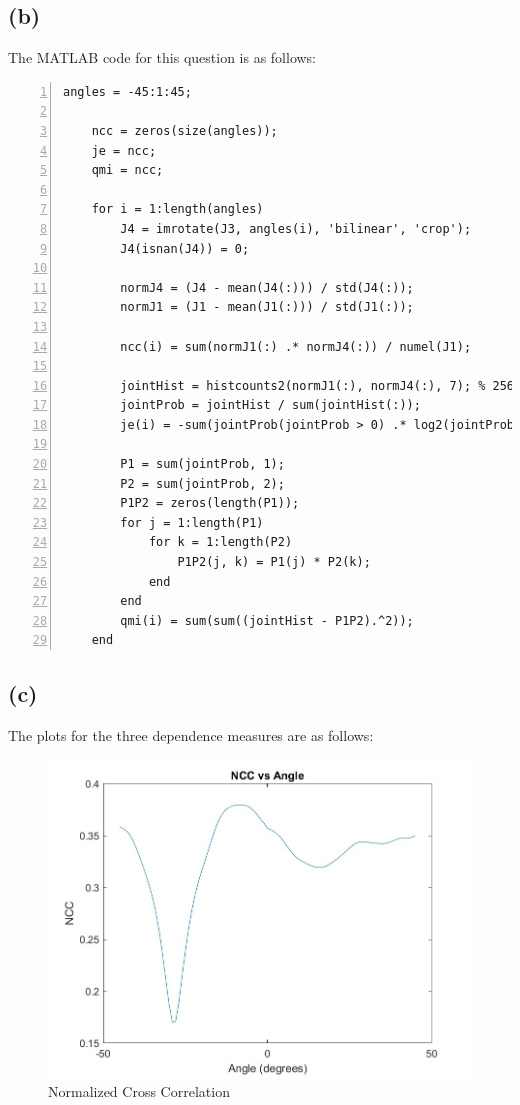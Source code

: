 \documentclass{article}
\begin{document}
\newpage
\subsection*{(b)}

The MATLAB code for this question is as follows:
\begin{lstlisting}[frame=single,numbers=left,style=Matlab-Pyglike,breaklines=true,postbreak=\mbox{\textcolor{red}{$\hookrightarrow$}\space}]
    angles = -45:1:45;

    ncc = zeros(size(angles));
    je = ncc;
    qmi = ncc;
    
    for i = 1:length(angles)
        J4 = imrotate(J3, angles(i), 'bilinear', 'crop');
        J4(isnan(J4)) = 0;
        
        normJ4 = (J4 - mean(J4(:))) / std(J4(:));
        normJ1 = (J1 - mean(J1(:))) / std(J1(:));
        
        ncc(i) = sum(normJ1(:) .* normJ4(:)) / numel(J1);
        
        jointHist = histcounts2(normJ1(:), normJ4(:), 7); % 256^(1/3) bins approximately
        jointProb = jointHist / sum(jointHist(:));
        je(i) = -sum(jointProb(jointProb > 0) .* log2(jointProb(jointProb > 0)));
        
        P1 = sum(jointProb, 1);
        P2 = sum(jointProb, 2);
        P1P2 = zeros(length(P1));
        for j = 1:length(P1)
            for k = 1:length(P2)
                P1P2(j, k) = P1(j) * P2(k);
            end
        end
        qmi(i) = sum(sum((jointHist - P1P2).^2));
    end
\end{lstlisting}

\newpage
\subsection*{(c)}

The plots for the three dependence measures are as follows:
\begin{figure}[H]
\centering
\includegraphics[scale=0.3]{NCC_vs_Angle.jpg}
\caption{Normalized Cross Correlation}
\end{figure}
\end{document}
